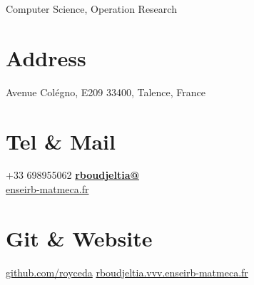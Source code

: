 \documentclass[]{friggeri-cv}
\begin{document}
      {Computer Science, Operation Research}
      
      

\begin{aside}
  \section{Address}
    Avenue Colégno, E209
    33400, Talence, France
    ~
  \section{Tel \& Mail}
    +33 698955062
   \href{mailto:rboudjeltia@enseirb-matmeca.fr}			{\textbf{rboudjeltia@}\\enseirb-matmeca.fr}
    ~
  \section{Git \& Website}
      \href{https://github.com/royceda}{github.com/royceda}
    \href{http://rboudjeltia.vvv.enseirb-matmeca.fr}{rboudjeltia.vvv.enseirb-matmeca.fr}
    ~

\end{aside}
\end{document}
